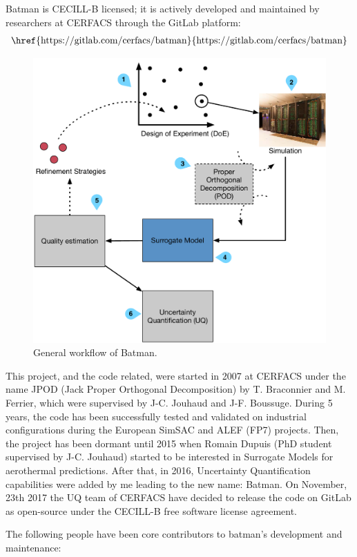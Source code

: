 Batman is CECILL-B licensed; it is actively developed and maintained by researchers at CERFACS through the GitLab platform:
\begin{align}
\text{\href{https://gitlab.com/cerfacs/batman}{https://gitlab.com/cerfacs/batman}}	\nonumber
\end{align}

\begin{figure}[!ht]
\centering
\includegraphics[width=0.8\linewidth,keepaspectratio]{fig/contributions/batman/workflow.pdf}
\caption{General workflow of Batman.}
\label{fig:batman_workflow}
\end{figure}

This project, and the code related, were started in 2007 at CERFACS under the name JPOD (Jack Proper Orthogonal Decomposition) by T. Braconnier and M. Ferrier, which were supervised by J-C. Jouhaud and J-F. Boussuge. During 5 years, the code has been successfully tested and validated on industrial configurations during the European SimSAC and ALEF (FP7) projects. Then, the project has been dormant until 2015 when Romain Dupuis (PhD student supervised by J-C. Jouhaud) started to be interested in Surrogate Models for aerothermal predictions. After that, in 2016, Uncertainty Quantification capabilities were added by me leading to the new name: Batman. On November, 23th 2017 the UQ team of CERFACS have decided to release the code on GitLab as open-source under the CECILL-B free software license agreement.

The following people have been core contributors to batman's development and maintenance:

